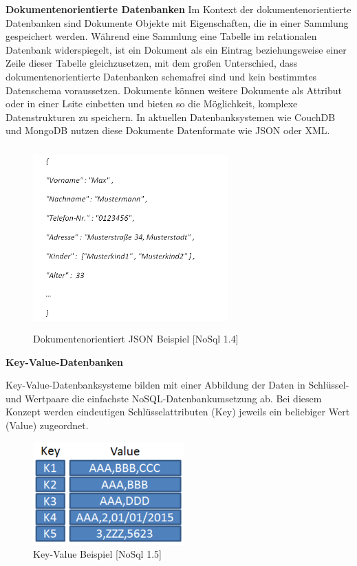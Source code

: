 \textbf{Dokumentenorientierte Datenbanken}
\newline
Im Kontext der dokumentenorientierte Datenbanken sind Dokumente Objekte mit Eigenschaften, die in einer Sammlung gespeichert werden. Während eine Sammlung eine Tabelle im relationalen Datenbank widerspiegelt, ist ein Dokument als ein Eintrag beziehungsweise einer Zeile dieser Tabelle gleichzusetzen, mit dem großen Unterschied, dass dokumentenorientierte Datenbanken schemafrei sind und kein bestimmtes Datenschema voraussetzen. Dokumente können weitere Dokumente als Attribut oder in einer Lsite einbetten und bieten so die Möglichkeit, komplexe Datenstrukturen zu speichern.  In aktuellen Datenbanksystemen wie CouchDB und MongoDB nutzen diese Dokumente Datenformate wie JSON oder XML. 

\begin{figure}[h]
\centering
\includegraphics[width=7.5cm, height = 7cm]{images/bsp_dokument.png}
\caption{Dokumentenorientiert JSON Beispiel [NoSql 1.4]}
\end{figure}

\textbf{Key-Value-Datenbanken}
\newline

Key-Value-Datenbanksysteme bilden mit einer Abbildung der Daten in Schlüssel- und Wertpaare die einfachste NoSQL-Datenbankumsetzung ab. Bei diesem Konzept werden eindeutigen Schlüsselattributen (Key) jeweils ein beliebiger Wert (Value) zugeordnet. 

\begin{figure}[h]
\centering
\includegraphics[]{images/KeyValue.PNG}
\caption{Key-Value Beispiel [NoSql 1.5]}
\end{figure}

